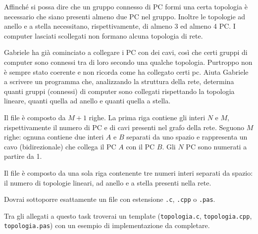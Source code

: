 Affinché si possa dire che un gruppo connesso di PC formi una certa topologia è necessario che siano presenti almeno due PC nel gruppo. Inoltre le topologie ad anello e a stella necessitano, rispettivamente, di almeno 3 ed almeno 4 PC. I computer lasciati scollegati non formano alcuna topologia di rete.

Gabriele ha già cominciato a collegare i PC con dei cavi, così che certi gruppi di computer sono connessi tra di loro secondo una qualche topologia. Purtroppo non è sempre stato coerente e non ricorda come ha collegato certi pc. Aiuta Gabriele a scrivere un programma che, analizzando la struttura della rete, determina quanti gruppi (connessi) di computer sono collegati rispettando la topologia lineare, quanti quella ad anello e quanti quella a stella.

\InputFile
Il file  è composto da $M+1$ righe. La prima riga contiene gli interi $N$ e $M$, rispettivamente il numero di PC e di cavi presenti nel grafo della rete. Seguono $M$ righe: ognuna contiene due interi $A$ e $B$ separati da uno spazio e rappresenta un cavo (bidirezionale) che collega il PC $A$ con il PC $B$. Gli $N$ PC sono numerati a partire da 1.

\OutputFile
Il file \outputfile{} è composto da una sola riga contenente tre numeri interi separati da spazio: il numero di topologie lineari, ad anello e a stella presenti nella rete.

\pagebreak
\Implementation
Dovrai sottoporre esattamente un file con estensione \texttt{.c}, \texttt{.cpp} o \texttt{.pas}.

\begin{warning}
Tra gli allegati a questo task troverai un template (\texttt{topologia.c}, \texttt{topologia.cpp}, \texttt{topologia.pas}) con un esempio di implementazione da completare.
\end{warning}


